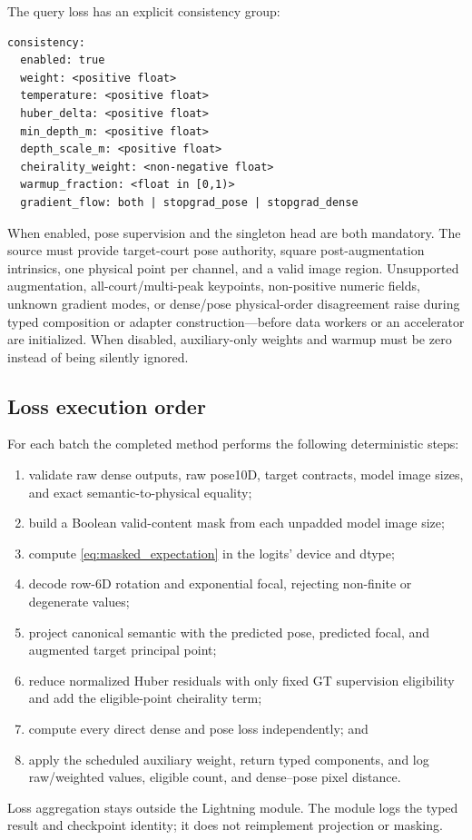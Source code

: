 The query loss has an explicit consistency group:
\begin{verbatim}
consistency:
  enabled: true
  weight: <positive float>
  temperature: <positive float>
  huber_delta: <positive float>
  min_depth_m: <positive float>
  depth_scale_m: <positive float>
  cheirality_weight: <non-negative float>
  warmup_fraction: <float in [0,1)>
  gradient_flow: both | stopgrad_pose | stopgrad_dense
\end{verbatim}
When enabled, pose supervision and the singleton \KP head are both mandatory.
The source must provide target-court pose authority, square post-augmentation
intrinsics, one physical point per channel, and a valid image region.  Unsupported
augmentation, all-court/multi-peak keypoints, non-positive numeric fields,
unknown gradient modes, or dense/pose physical-order disagreement raise during
typed composition or adapter construction---before data workers or an
accelerator are initialized.  When disabled, auxiliary-only weights and warmup
must be zero instead of being silently ignored.

\subsection{Loss execution order}

For each batch the completed method performs the following deterministic steps:
\begin{enumerate}
  \item validate raw dense outputs, raw pose10D, target contracts, model image
    sizes, and exact semantic-to-physical equality;
  \item build a Boolean valid-content mask from each unpadded model image size;
  \item compute \cref{eq:masked_expectation} in the logits' device and dtype;
  \item decode row-6D rotation and exponential focal, rejecting non-finite or
    degenerate values;
  \item project canonical semantic \KP with the predicted pose, predicted focal,
    and augmented target principal point;
  \item reduce normalized Huber residuals with only fixed GT supervision
    eligibility and add the eligible-point cheirality term;
  \item compute every direct dense and pose loss independently; and
  \item apply the scheduled auxiliary weight, return typed components, and log
    raw/weighted values, eligible count, and dense--pose pixel distance.
\end{enumerate}
Loss aggregation stays outside the Lightning module.  The module logs the typed
result and checkpoint identity; it does not reimplement projection or masking.

